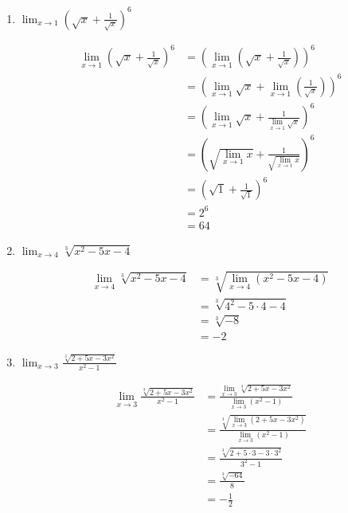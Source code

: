 \documentclass[a4paper, 12pt]{article}
\begin{document}
\begin{enumerate}
\begin{enumerate}
        \item $\lim_{x \to 1} \left( \sqrt{x} + \frac{1}{\sqrt{x}} \right)^6$
        
        \begin{align*}
            \lim_{x \to 1} \left( \sqrt{x} + \frac{1}{\sqrt{x}} \right)^6 &= \left( \lim_{x \to 1}\left(\sqrt{x} + \frac{1}{\sqrt{x}}\right) \right)^6 \tag*{[l. pot.]}\\
            &= \left( \lim_{x \to 1}\sqrt{x} + \lim_{x \to 1}\left(\frac{1}{\sqrt{x}}\right) \right)^6 \tag*{[l. soma.]} \\
            &= \left( \lim_{x \to 1}\sqrt{x} + \frac{1}{\lim_{x \to 1}\sqrt{x}}\right)^6 \tag*{[l. quo.]} \\
            &= \left( \sqrt{\lim_{x \to 1}x} + \frac{1}{\sqrt{\lim_{x \to 1} x}}\right)^6 \tag*{[l. raíz.]} \\
            &= \left( \sqrt{1} + \frac{1}{\sqrt{1}} \right) ^6 \tag*{[l. pol.]}\\
            &= 2^6 \\
            &= 64
        \end{align*}

        \item $\lim_{x \to 4} \sqrt[3]{x^2 - 5x - 4}$
        
        \begin{align*}
            \lim_{x \to 4} \sqrt[3]{x^2 - 5x - 4} &= \sqrt[3]{\lim_{x \to 4}(x^2 - 5x - 4)} \tag*{[l. raíz]}\\
            &= \sqrt[3]{4^2 - 5\cdot 4 - 4} \tag*{[l. pol.]}\\
            &= \sqrt[3]{-8}\\
            &= -2
        \end{align*}

        \item $\lim_{x \to 3} \frac{\sqrt[3]{2 + 5x - 3x^2}}{x^2 -1}$
        
        \begin{align*}
            \lim_{x \to 3} \frac{\sqrt[3]{2 + 5x - 3x^2}}{x^2 -1} &= \frac{\lim_{x \to 3}\sqrt[3]{2 + 5x - 3x^2}}{\lim_{x \to 3}(x^2 -1)} \tag*{[l. quo.]}\\
            &= \frac{\sqrt[3]{\lim_{x \to 3}(2 + 5x - 3x^2)}}{\lim_{x \to 3}(x^2 -1)} \tag*{[l. raíz.]}\\
            &= \frac{\sqrt[3]{2 + 5\cdot 3 - 3\cdot 3^2}}{3^2 -1} \tag*{[l. pol.]} \\
            &= \frac{\sqrt[3]{-64}}{8} \\
            &= -\frac{1}{2}
        \end{align*}


\end{enumerate}
\end{enumerate}
\end{document}
